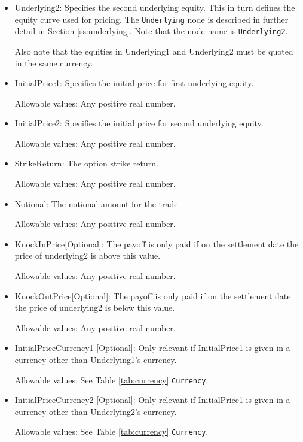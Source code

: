 \begin{itemize}
\item Underlying2:  Specifies the second underlying equity. This in turn defines the equity curve used for pricing. The \lstinline!Underlying! node is described in further detail in Section \ref{ss:underlying}. Note that the node name is \lstinline!Underlying2!.

Also note that the equities in Underlying1 and Underlying2 must be quoted in the same currency.

\item InitialPrice1:  Specifies the initial price for first underlying equity.

Allowable values:  Any positive real number.	
    
\item InitialPrice2:  Specifies the initial price for second underlying equity.

Allowable values:  Any positive real number.	
    
\item StrikeReturn: The option strike return.
    
Allowable values:  Any positive real number.	
    
\item Notional: The notional amount for the trade.
    
Allowable values:  Any positive real number.

\item KnockInPrice[Optional]: The payoff is only paid if on the settlement date the price of underlying2 is above this value.
    
Allowable values:  Any positive real number.

\item KnockOutPrice[Optional]: The payoff is only paid if on the settlement date the price of underlying2 is below this value.
    
Allowable values:  Any positive real number.

\item InitialPriceCurrency1 [Optional]: Only relevant if InitialPrice1 is given in a currency other than Underlying1's currency.

Allowable values:  See Table \ref{tab:currency} \lstinline!Currency!.

\item InitialPriceCurrency2 [Optional]: Only relevant if InitialPrice1 is given in a currency other than Underlying2's currency.

Allowable values:  See Table \ref{tab:currency} \lstinline!Currency!.


\end{itemize}
